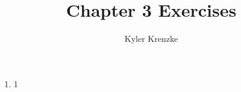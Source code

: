 \documentclass[11pt]{article}
\title{Chapter 3 Exercises}
\author{Kyler Krenzke}
\date{}
\begin{document}
	\maketitle
	
	\begin{enumerate}
	
		\item 1
	
	\end{enumerate}
\end{document}
